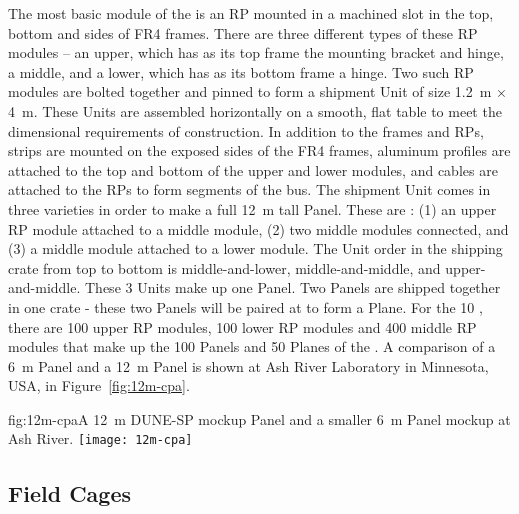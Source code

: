 The most basic module of the  is an RP mounted in a machined slot in the top, bottom and sides of FR4 frames.  There are three different types of these  RP modules -- an upper, which has as its top frame the  mounting bracket and  hinge, a middle, and a lower, which has as its bottom frame a  hinge.  Two such  RP modules are bolted together and pinned to form a shipment  Unit of size \SI{1.2}{\m} $\times$ \SI{4}{\m}.  These  Units are assembled horizontally on a smooth, flat table to meet the dimensional requirements of  construction.  In addition to the frames and RPs, %
 strips are mounted on the exposed sides of the FR4 frames, aluminum profiles are attached to the top and bottom of the upper and lower modules, and cables are attached to the RPs to form segments of the  bus.  The shipment  Unit comes in three varieties in order to make a full \SI{12}{\m} tall  Panel.  These are : (1) an upper  RP module attached to a middle module, (2) two middle modules connected, and (3) a middle module attached to a lower module.  The  Unit order in the shipping crate from top to bottom is middle-and-lower, middle-and-middle, and upper-and-middle.  These 3  Units make up one  Panel.  Two  Panels are shipped together in one crate - these two Panels will be paired at \surf to form a  Plane.  For the \SI{10}{\kt} , there are 100 upper  RP modules, 100 lower  RP modules and 400 middle  RP modules that make up the 100  Panels and 50  Planes of the .
A comparison of a \SI{6}{\m}   Panel and a \SI{12}{\m}   Panel is shown at Ash River Laboratory in Minnesota, USA,  in Figure~\ref{fig:12m-cpa}.

\begin{dunefigure}{fig:12m-cpa}{A \SI{12}{\m} DUNE-SP  mockup Panel and a smaller \SI{6}{\m}  Panel mockup at Ash River.}  %
\texttt{[image: 12m-cpa]}
\end{dunefigure}

\subsection{Field Cages}
\label{sec:fdsp-hv-prod-fc}

